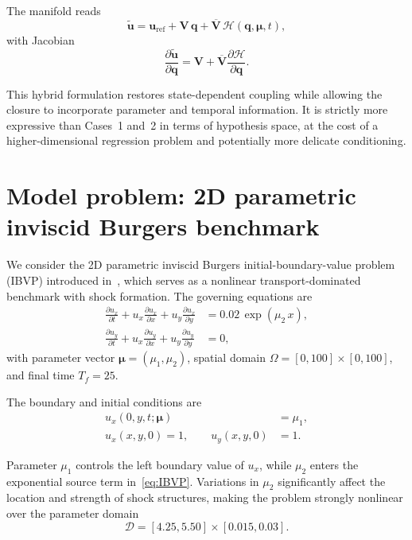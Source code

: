 \documentclass[11pt]{article}
\begin{document}
The manifold reads
\begin{equation}
\tilde{\mathbf u}
=
\mathbf u_{\mathrm{ref}}
+
\mathbf V\,\mathbf q
+
\overline{\mathbf V}\,
\mathcal H(\mathbf q,\bm\mu,t),
\end{equation}
with Jacobian
\[
\frac{\partial \tilde{\mathbf u}}{\partial \mathbf q}
=
\mathbf V
+
\overline{\mathbf V}
\frac{\partial \mathcal H}{\partial \mathbf q}.
\]

This hybrid formulation restores state-dependent coupling while allowing the closure to incorporate parameter and temporal information. 
It is strictly more expressive than Cases~1 and~2 in terms of hypothesis space, at the cost of a higher-dimensional regression problem and potentially more delicate conditioning.
\section{Model problem: 2D parametric inviscid Burgers benchmark}

We consider the 2D parametric inviscid Burgers initial-boundary-value problem (IBVP) introduced in~\cite{barnett2023neural}, which serves as a nonlinear transport-dominated benchmark with shock formation. The governing equations are
\begin{align}
\label{eq:IBVP}
\frac{\partial u_x}{\partial t}
+ u_x\frac{\partial u_x}{\partial x}
+ u_y\frac{\partial u_x}{\partial y}
&= 0.02\,\exp(\mu_2\,x), \\
\frac{\partial u_y}{\partial t}
+ u_x\frac{\partial u_y}{\partial x}
+ u_y\frac{\partial u_y}{\partial y}
&= 0,
\end{align}
with parameter vector $\boldsymbol{\mu}=(\mu_1,\mu_2)$, spatial domain
$\Omega=[0,100]\times[0,100]$, and final time $T_f=25$.

The boundary and initial conditions are
\begin{align}
u_x(0,y,t;\boldsymbol{\mu}) &= \mu_1, \\
u_x(x,y,0) = 1,
\qquad
u_y(x,y,0) &= 1.
\end{align}

Parameter $\mu_1$ controls the left boundary value of $u_x$, while $\mu_2$ enters the exponential source term in~\eqref{eq:IBVP}. Variations in $\mu_2$ significantly affect the location and strength of shock structures, making the problem strongly nonlinear over the parameter domain
\begin{equation}
\mathcal D = [4.25,5.50]\times[0.015,0.03].
\end{equation}
\end{document}
